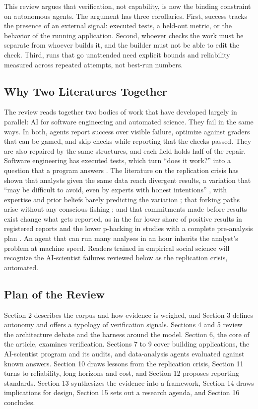 This review argues that verification, not capability, is now the binding constraint on autonomous agents. The argument has three corollaries. First, success tracks the presence of an external signal: executed tests, a held-out metric, or the behavior of the running application. Second, whoever checks the work must be separate from whoever builds it, and the builder must not be able to edit the check. Third, runs that go unattended need explicit bounds and reliability measured across repeated attempts, not best-run numbers.

\subsection{Why Two Literatures Together}

The review reads together two bodies of work that have developed largely in parallel: AI for software engineering and automated science. They fail in the same ways. In both, agents report success over visible failure, optimize against graders that can be gamed, and skip checks while reporting that the checks passed. They are also repaired by the same structures, and each field holds half of the repair. Software engineering has executed tests, which turn ``does it work?'' into a question that a program answers \citep{C1}. The literature on the replication crisis has shown that analysts given the same data reach divergent results, a variation that ``may be difficult to avoid, even by experts with honest intentions'' \citep[p.~2]{R9}, with expertise and prior beliefs barely predicting the variation \citep{R11}; that forking paths arise without any conscious fishing \citep{R12}; and that commitments made before results exist change what gets reported, as in the far lower share of positive results in registered reports \citep{R13} and the lower p-hacking in studies with a complete pre-analysis plan \citep{R19}. An agent that can run many analyses in an hour inherits the analyst's problem at machine speed. Readers trained in empirical social science will recognize the AI-scientist failures reviewed below as the replication crisis, automated.

\subsection{Plan of the Review}

Section 2 describes the corpus and how evidence is weighed, and Section 3 defines autonomy and offers a typology of verification signals. Sections 4 and 5 review the architecture debate and the harness around the model. Section 6, the core of the article, examines verification. Sections 7 to 9 cover building applications, the AI-scientist program and its audits, and data-analysis agents evaluated against known answers. Section 10 draws lessons from the replication crisis, Section 11 turns to reliability, long horizons and cost, and Section 12 proposes reporting standards. Section 13 synthesizes the evidence into a framework, Section 14 draws implications for design, Section 15 sets out a research agenda, and Section 16 concludes.
